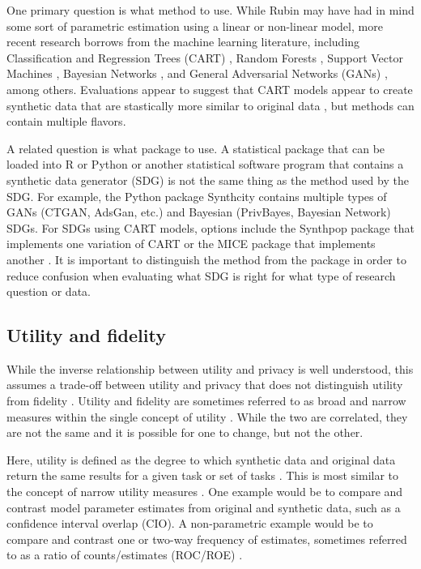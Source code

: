 \documentclass[runningheads]{llncs}
\begin{document}
One primary question is what method to use.  While Rubin \cite{rubin1993statistical} may have had in mind some sort of parametric estimation using a linear or non-linear model, more recent research borrows from the machine learning literature, including Classification and Regression Trees (CART) \cite{reiter2005using}, Random Forests \cite{caiola2010random}, Support Vector Machines \cite{drechsler2010using}, Bayesian Networks \cite{zhang2017privbayes}, and General Adversarial Networks (GANs) \cite{goodfellow2014generative}, among others.  Evaluations appear to suggest that CART models appear to create synthetic data that are stastically more similar to original data  \cite{little2022comparing,dankar2021fake,drechsler2011empirical}, but methods can contain multiple flavors.  

A related question is what package to use.  A statistical package that can be loaded into R or Python or another statistical software program that contains a synthetic data generator (SDG) is not the same thing as the method used by the SDG.  For example, the Python package Synthcity \cite{synthcity} contains multiple types of GANs (CTGAN, AdsGan, etc.) and Bayesian (PrivBayes, Bayesian Network) SDGs.  For SDGs using CART models, options include the Synthpop package \cite{nowok2016synthpop} that implements one variation of CART \cite{reiter2005using} or the MICE package \cite{van2011mice} that implements another \cite{doove2014recursive}.  It is important to distinguish the method from the package in order to reduce confusion when evaluating what SDG is right for what type of research question or data.

\subsection{Utility and fidelity}

While the inverse relationship between utility and privacy is well understood, this assumes a trade-off between utility and privacy that does not distinguish utility from fidelity \cite{jordon2022synthetic}.  Utility and fidelity are sometimes referred to as broad and narrow measures within the single concept of utility \cite{snoke2018general,drechsler2009disclosure}.  While the two are correlated, they are not the same and it is possible for one to change, but not the other.  

Here, utility is defined as the degree to which synthetic data and original data return the same results for a given task or set of tasks \cite{jordon2022synthetic}.  This is most similar to the concept of narrow utility measures \cite{drechsler2009disclosure}.  One example would be to compare and contrast model parameter estimates from original and synthetic data, such as a confidence interval overlap (CIO).  A non-parametric example would be to compare and contrast one or two-way frequency of estimates, sometimes referred to as a ratio of counts/estimates (ROC/ROE) \cite{little2022comparing}.  
\end{document}
